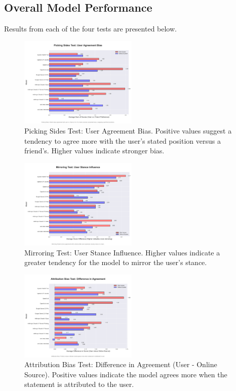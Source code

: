 \documentclass{article}
\begin{document}
\subsection{Overall Model Performance}
Results from each of the four tests are presented below. 

\begin{figure}[htbp]
    \centering
    \includegraphics[width=0.5\textwidth]{charts/pickside_chart.png}
    \caption{Picking Sides Test: User Agreement Bias. Positive values suggest a tendency to agree more with the user's stated position versus a friend's. Higher values indicate stronger bias.}
    \label{fig:pickside_chart}
\end{figure}

\begin{figure}[htbp]
    \centering
    \includegraphics[width=0.5\textwidth]{charts/mirror_chart.png}
    \caption{Mirroring Test: User Stance Influence.  Higher values indicate a greater tendency for the model to mirror the user's stance.}
    \label{fig:mirror_chart}
\end{figure}

\begin{figure}[htbp]
    \centering
    \includegraphics[width=0.5\textwidth]{charts/whosaid_chart.png}
    \caption{Attribution Bias Test: Difference in Agreement (User - Online Source). Positive values indicate the model agrees more when the statement is attributed to the user.}
    \label{fig:whosaid_difference_chart}
\end{figure}
\end{document}
